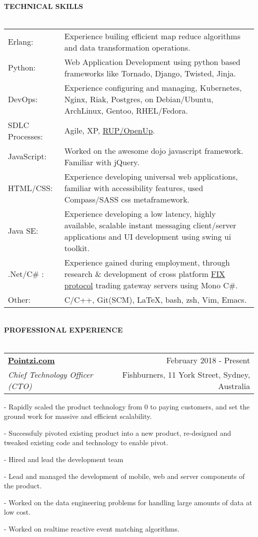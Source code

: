 \documentclass[10pt]{article}
\makeatletter
\newcommand{\lineunder}{\vspace*{-10pt} \\ \hspace*{-18pt} \hrulefill \vspace{2pt}\\}
\newcommand{\header}[1]{{\hspace*{-15pt}\vspace*{-0pt}\\ \uppercase{\textbf {#1}}}  \lineunder}
\newcommand{\employer}[4]{ 
        \vspace*{6pt}
	\begin{tabular*}{\textwidth}{l@{\extracolsep{\fill}}r}
	\textbf{#1} & #2 \\
                #3  & #4 \\ 
	\end{tabular*}
}
\newenvironment{achievements}{
        \vspace{-0pt}
        \begin{list}
        {}
        {\topsep 0pt \itemsep -3pt}
}
{
        \end{list}
}
\makeatother
\begin{document}
\header{Technical Skills}
\vspace{2pt}
\begin{tabular*}{\textwidth}{p{3cm}p{}}
    Erlang: & Experience builing efficient map reduce algorithms and data transformation operations. \\
    Python: & Web Application Development using python based frameworks like Tornado, Django, Twisted, Jinja.  \\
    DevOps: & Experience configuring and managing, Kubernetes, Nginx, Riak, Postgres, on Debian/Ubuntu, ArchLinux, Gentoo, RHEL/Fedora. \\
    SDLC Processes: & Agile, XP, \href{http://en.wikipedia.org/wiki/Unified\_process}{RUP/OpenUp}. \\
    JavaScript: & Worked on the awesome dojo javascript framework. Familiar with jQuery. \\
    HTML/CSS: & Experience developing universal web applications, familiar with accessibility features, used Compass/SASS css metaframework. \\
    Java SE: & Experience developing a low latency, highly available, scalable instant messaging client/server applications and UI development using swing ui toolkit. \\
    .Net/C\# : & Experience gained during employment, through research \& development of cross platform \href{http://en.wikipedia.org/wiki/FIX_protocol}{FIX protocol} trading gateway servers using Mono C\#. \\
    Other: & C/C++, Git(SCM), \LaTeX, bash, zsh, Vim, Emacs.\\
\end{tabular*}
\vspace{15pt}
\header{Professional Experience}
\employer{\href{http://www.pointzi.com/}{Pointzi.com}}{February 2018 - Present}{\emph{Chief Technology Officer (CTO)}} {Fishburners, 11 York Street, Sydney, Australia}
	\begin{achievements}
      \item[-] Rapidly scaled the product technology from 0 to paying customers, and set the ground work for massive and efficient scalability. 
      \item[-] Successfuly pivoted existing product into a new product, re-designed and tweaked existing code and technology to enable pivot.
      \item[-] Hired and lead the development team
      \item[-] Lead and managed the development of mobile, web and server components of the product.
      \item[-] Worked on the data engineering problems for handling large amounts of data at low cost.
      \item[-] Worked on realtime reactive event matching algorithms.
    \end{achievements}
\end{document}
